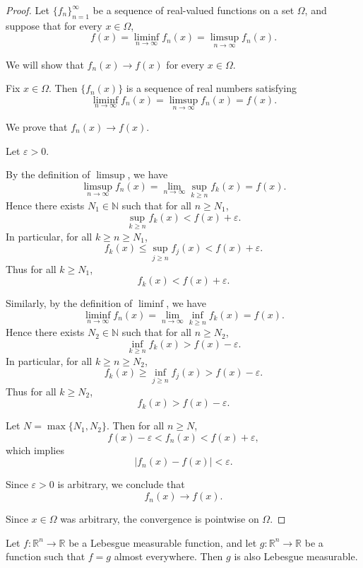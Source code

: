 \begin{proof}
Let $\{f_n\}_{n=1}^\infty$ be a sequence of real-valued functions on a set $\Omega$, and suppose that for every $x \in \Omega$,
\[
f(x) = \liminf_{n\to\infty} f_n(x) = \limsup_{n\to\infty} f_n(x).
\]

We will show that $f_n(x) \to f(x)$ for every $x \in \Omega$.

Fix $x \in \Omega$. Then $\{f_n(x)\}$ is a sequence of real numbers satisfying
\[
\liminf_{n\to\infty} f_n(x) = \limsup_{n\to\infty} f_n(x) = f(x).
\]

We prove that $f_n(x) \to f(x)$.

\medskip

Let $\varepsilon > 0$.

By the definition of $\limsup$, we have
\[
\limsup_{n\to\infty} f_n(x) = \lim_{n\to\infty} \sup_{k \ge n} f_k(x) = f(x).
\]
Hence there exists $N_1 \in \mathbb{N}$ such that for all $n \ge N_1$,
\[
\sup_{k \ge n} f_k(x) < f(x) + \varepsilon.
\]
In particular, for all $k \ge n \ge N_1$,
\[
f_k(x) \le \sup_{j \ge n} f_j(x) < f(x) + \varepsilon.
\]
Thus for all $k \ge N_1$,
\[
f_k(x) < f(x) + \varepsilon.
\]

\medskip

Similarly, by the definition of $\liminf$, we have
\[
\liminf_{n\to\infty} f_n(x) = \lim_{n\to\infty} \inf_{k \ge n} f_k(x) = f(x).
\]
Hence there exists $N_2 \in \mathbb{N}$ such that for all $n \ge N_2$,
\[
\inf_{k \ge n} f_k(x) > f(x) - \varepsilon.
\]
In particular, for all $k \ge n \ge N_2$,
\[
f_k(x) \ge \inf_{j \ge n} f_j(x) > f(x) - \varepsilon.
\]
Thus for all $k \ge N_2$,
\[
f_k(x) > f(x) - \varepsilon.
\]

\medskip

Let $N = \max\{N_1, N_2\}$. Then for all $n \ge N$,
\[
f(x) - \varepsilon < f_n(x) < f(x) + \varepsilon,
\]
which implies
\[
|f_n(x) - f(x)| < \varepsilon.
\]

\medskip

Since $\varepsilon > 0$ is arbitrary, we conclude that
\[
f_n(x) \to f(x).
\]

Since $x \in \Omega$ was arbitrary, the convergence is pointwise on $\Omega$.
\end{proof}

\begin{theorem} \label{thm: almost equal to measurable func then measurable}
Let $f:\mathbb{R}^n \to \mathbb{R}$ be a Lebesgue measurable function, and let $g:\mathbb{R}^n \to \mathbb{R}$ be a function such that $f=g$ almost everywhere. Then $g$ is also Lebesgue measurable.
\end{theorem}

